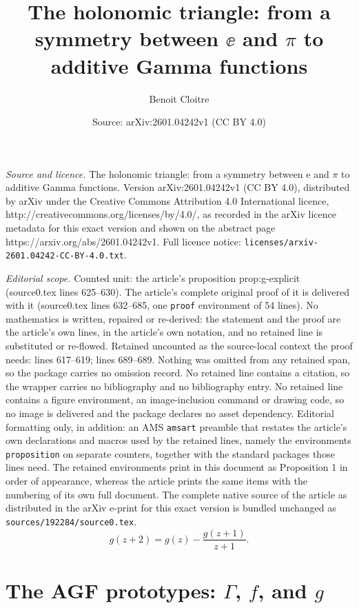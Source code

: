 \documentclass[10pt,a4paper]{amsart}
\title{The holonomic triangle: from a symmetry between $\ee$ and $\pi$ to additive Gamma functions}
\author{Benoit Cloitre}
\date{Source: arXiv:2601.04242v1 (CC BY 4.0)}
\newcommand{\ee}{\mathrm{e}}
\begin{document}
\maketitle

\noindent\emph{Source and licence.} The holonomic triangle: from a symmetry between $\ee$ and $\pi$ to additive Gamma functions. Version arXiv:2601.04242v1 (CC BY 4.0), distributed by arXiv under the Creative Commons Attribution 4.0 International licence, http://creativecommons.org/licenses/by/4.0/, as recorded in the arXiv licence metadata for this exact version and shown on the abstract page https://arxiv.org/abs/2601.04242v1. Full licence notice: \texttt{licenses/arxiv-2601.04242-CC-BY-4.0.txt}.\par\smallskip

\noindent\textit{Editorial scope.} Counted unit: the article's proposition prop:g-explicit (source0.tex lines 625--630). The article's complete original proof of it is delivered with it (source0.tex lines 632--685, one \texttt{proof} environment of 54 lines). No mathematics is written, repaired or re-derived: the statement and the proof are the article's own lines, in the article's own notation, and no retained line is substituted or re-flowed.  Retained uncounted as the source-local context the proof needs: lines 617--619; lines 689--689.  Nothing was omitted from any retained span, so the package carries no omission record.  No retained line contains a citation, so the wrapper carries no bibliography and no bibliography entry.  No retained line contains a figure environment, an image-inclusion command or drawing code, so no image is delivered and the package declares no asset dependency.  Editorial formatting only, in addition: an AMS \texttt{amsart} preamble that restates the article's own declarations and macros used by the retained lines, namely the environments \texttt{proposition} on separate counters, together with the standard packages those lines need.  The retained environments print in this document as Proposition 1 in order of appearance, whereas the article prints the same items with the numbering of its own full document.  The complete native source of the article as distributed in the arXiv e-print for this exact version is bundled unchanged as \texttt{sources/192284/source0.tex}.
\begin{equation}\label{eq:g-AFE}
g(z+2) = g(z) - \frac{g(z+1)}{z+1}.
\end{equation}

\section{The AGF prototypes: $\Gamma$, $f$, and $g$}\label{sec:gamma-prototype}
\end{document}

